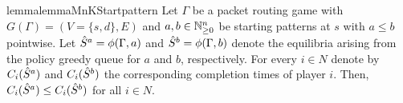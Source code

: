 

\begin{restatable}{lemma}{lemmaMnKStartpattern}\label{lemma_mnK_startpattern}
Let $\Gamma$ be a packet routing game with $G(\Gamma)=(V=\{s,d\},E)$ and $a, b\in \mathbb{N}_{\geq 0}^n$ be starting patterns at $s$ with $a\leq b$ pointwise. Let $\hat{S}^a = \phi(\Gamma, a)$ and $\hat{S}^b = \phi(\Gamma, b)$ denote the equilibria arising from the policy greedy queue for $a$ and $b$, respectively. For every $i \in N$ denote by $C_i(\hat{S}^a)$ and $C_i(\hat{S}^b)$ the corresponding completion times of player $i$. Then, $C_i(\hat{S}^a)\leq C_i(\hat{S}^b)$ for all $i\in N$.
\end{restatable}

